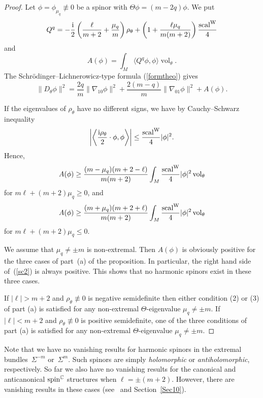 \documentclass[10pt,a4paper]{amsart}
\numberwithin{equation}{section}
\newcommand{\CC}{\mathbb{C}}
\begin{document}
\begin{proof} Let $\phi=\phi_{\mu_q}\not\equiv 0$ be a spinor with $\Theta\phi=(m-2q)\phi$. We put
\begin{gather} \label{KTerm}
Q^q = - \frac{{\rm i}}{2}\left( \frac{\ell}{m+2}+\frac{\mu_q}{m}\right)\rho_\theta + \left(1+\frac{\ell\mu_q}{m(m+2)}\right)\frac{{\rm scal}^{\rm W}}{4}
\end{gather}
and \[A(\phi) = \int_M \big\langle Q^q\phi,\phi\big\rangle \operatorname{vol}_\theta.\]
The Schr\"odinger--Lichnerowicz-type formula (\ref{formtheo}) gives
\begin{equation}\label{sc2}
\|D_\theta\phi\|^2 = \frac{2q}{m}\|\nabla_{10}\phi\|^2 + \frac{2(m-q)}{m}\|\nabla_{01}\phi\|^2 + A(\phi).
\end{equation}

If the eigenvalues of $\rho_\theta$ have no different signs, we have by Cauchy--Schwarz inequality
\[
\left|\left\langle \frac{{\rm i}\rho_\theta}{2}\cdot\phi,\phi\right\rangle\right| \leq \frac{{\rm scal}^{\rm W}}{4}|\phi|^2.
\]
Hence,
\[
A(\phi) \geq \frac{(m-\mu_q)(m+2-\ell)}{m(m+2)} \int_M \frac{{\rm scal}^{\rm W}}{4}|\phi|^2\operatorname{vol}_\theta
\]
for $m\ell+(m+2)\mu_q\geq 0$, and
\[
A(\phi) \geq \frac{(m+\mu_q)(m+2+\ell)}{m(m+2)} \int_M \frac{{\rm scal}^{\rm W}}{4}|\phi|^2\operatorname{vol}_\theta
\]
for $m\ell+(m+2)\mu_q\leq 0$.

We assume that $\mu_q\neq \pm m$ is non-extremal. Then $A(\phi)$ is obviously positive for the three cases of part~(a) of the proposition.
In particular, the right hand side of~(\ref{sc2}) is always positive. This shows that no harmonic spinors exist in these three cases.

If $|\ell|>m+2$ and $\rho_\theta\not\equiv 0$ is negative semidefinite then either condition (2) or (3) of part (a) is satisfied
for any non-extremal $\Theta$-eigenvalue $\mu_q\neq \pm m$. If
$|\ell|<m+2$ and $\rho_\theta\not\equiv 0$ is positive semidefinite, one of the three conditions of part (a) is satisfied
for any non-extremal $\Theta$-eigenvalue $\mu_q\neq \pm m$.
\end{proof}

Note that we have no vanishing results for harmonic spinors in the extremal bundles~$\Sigma^{-m}$ or~$\Sigma^{m}$. Such spinors
are simply {\em holomorphic} or {\em antiholomorphic}, respectively. So far we also have no vanishing results for the canonical and anticanonical ${\rm spin}^\CC$ structures when $\ell=\pm (m+2)$. However, there are vanishing results in these cases (see~\cite{Tan} and Section~\ref{Sec10}).
\end{document}
